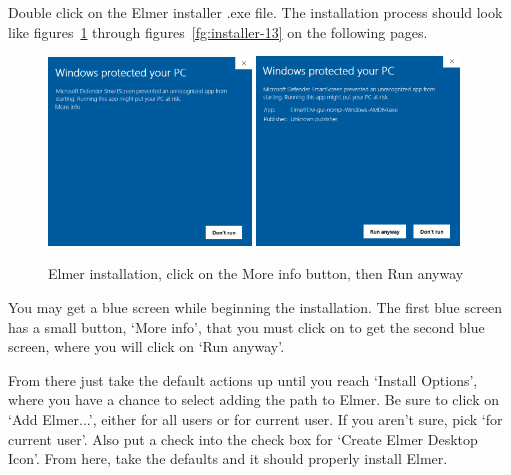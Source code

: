 Double click on the Elmer installer .exe file.  The installation process should look like figures~\ref{fg:installer-1}  through figures~\ref{fg:installer-13} on the following pages.  

\begin{figure}[H]
\begin{center}
\includegraphics[width=0.48\textwidth]{installer-1}
\includegraphics[width=0.48\textwidth]{installer-2}
\caption{Elmer installation, click on the More info button, then Run anyway}\label{fg:installer-1}
\end{center}
\end{figure}

You may get a blue screen while beginning the installation.  The first blue screen has a small button, `More info', that you must click on to get the second blue screen, where you will click on `Run anyway'. 

From there just take the default actions up until you reach `Install Options', where you have a chance to select adding the path to Elmer.  Be sure to click on `Add Elmer...', either for all users or for current user.  If you aren't sure, pick `for current user'.  Also put a check into the check box for `Create Elmer Desktop Icon'.  From here, take the defaults and it should properly install Elmer.\\

